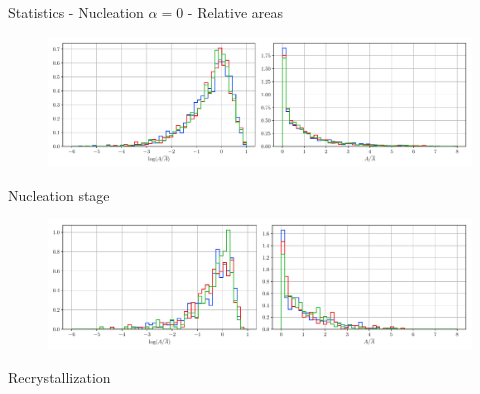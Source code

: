 \documentclass[usenames,dvipsnames]{beamer}
\begin{document}
\begin{frame}{Statistics - Nucleation $\alpha = 0$ - Relative areas}
\small
\centering
    \vspace{-0.5em}
    \begin{figure}
        \centering
        \includegraphics[scale=0.35]{figures/stored_energy/SE/areas/000110_nuclconstant_set.pdf}
    \end{figure}
    \vspace{-1em}
    Nucleation stage
    \begin{figure}
        \centering
        \includegraphics[scale=0.35]{figures/stored_energy/SE/areas/000240_nuclconstant_set.pdf}
    \end{figure}
    \vspace{-1em}
    Recrystallization
\end{frame}
\end{document}
